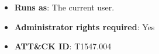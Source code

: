 \begin{enumerate}[label={\textbf{RP\arabic*}:}, ref=RP\arabic*, start=0]
    \begin{itemize}[label={}, leftmargin=*]
        \item \textbf{Runs as}: The current user.
        \item \textbf{Administrator rights required}: Yes
        \item \textbf{ATT\&CK ID}: T1547.004
    \end{itemize}
\end{enumerate}
